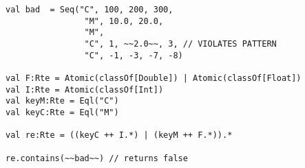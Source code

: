 \begin{lstlisting}[style=scalaioScala]
val bad  = Seq("C", 100, 200, 300,
                "M", 10.0, 20.0,
                "M",
                "C", 1, ~~2.0~~, 3, // VIOLATES PATTERN
                "C", -1, -3, -7, -8)

val F:Rte = Atomic(classOf[Double]) | Atomic(classOf[Float])
val I:Rte = Atomic(classOf[Int])
val keyM:Rte = Eql("C")
val keyC:Rte = Eql("M")

val re:Rte = ((keyC ++ I.*) | (keyM ++ F.*)).*

re.contains(~~bad~~) // returns false
\end{lstlisting}
